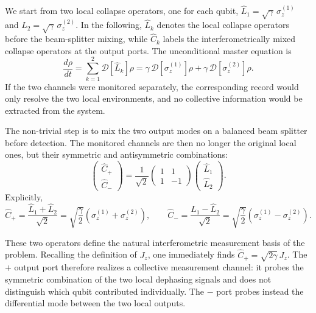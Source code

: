 We start from two local collapse operators, one for each qubit, \(\hat L_1=\sqrt{\gamma}\,\sigma_z^{(1)}\) and \(\hat L_2=\sqrt{\gamma}\,\sigma_z^{(2)}\). In the following, \(\hat L_k\) denotes the local collapse operators before the beam-splitter mixing, while \(\hat C_k\) labels the interferometrically mixed collapse operators at the output ports. The unconditional master equation is
\begin{equation}
	\frac{d\rho}{dt}
	=
	\sum_{k=1}^{2}\mathcal{D}[\hat L_k]\rho
	=
	\gamma\,\mathcal{D}[\sigma_z^{(1)}]\rho
	+
	\gamma\,\mathcal{D}[\sigma_z^{(2)}]\rho.
	\label{eq:N2_unconditional_results}
\end{equation}
If the two channels were monitored separately, the corresponding record would only resolve the two local environments, and no collective information would be extracted from the system.

The non-trivial step is to mix the two output modes on a balanced beam splitter before detection. The monitored channels are then no longer the original local ones, but their symmetric and antisymmetric combinations:
\begin{equation}
	\begin{pmatrix}
		\hat C_+ \\
		\hat C_-
	\end{pmatrix}
	=
	\frac{1}{\sqrt{2}}
	\begin{pmatrix}
		1 & 1 \\
		1 & -1
	\end{pmatrix}
	\begin{pmatrix}
		\hat L_1 \\
		\hat L_2
	\end{pmatrix}.
	\label{eq:N2_BS_transformation_results}
\end{equation}
Explicitly,
\begin{equation}
	\hat C_+
	=
	\frac{\hat L_1+\hat L_2}{\sqrt{2}}
	=
	\sqrt{\frac{\gamma}{2}}\left(\sigma_z^{(1)}+\sigma_z^{(2)}\right),
	\qquad
	\hat C_-
	=
	\frac{\hat L_1-\hat L_2}{\sqrt{2}}
	=
	\sqrt{\frac{\gamma}{2}}\left(\sigma_z^{(1)}-\sigma_z^{(2)}\right).
	\label{eq:N2_Cpm_results}
\end{equation}

These two operators define the natural interferometric measurement basis of the problem. Recalling the definition of $J_z$, one immediately finds $\hat C_+ = \sqrt{2\gamma}\,J_z$. The \(+\) output port therefore realizes a collective measurement channel: it probes the symmetric combination of the two local dephasing signals and does not distinguish which qubit contributed individually. The \(-\) port probes instead the differential mode between the two local outputs. 

